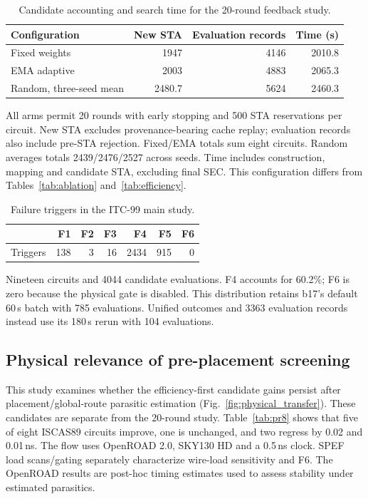 \documentclass[preprint,12pt]{elsarticle}
\begin{document}
\begin{table}[htbp]\centering\small
\caption{Candidate accounting and search time for the 20-round feedback study.}\label{tab:runtime}
\begin{tabular}{lrrr}\toprule
Configuration & New STA & Evaluation records & Time (s)\\\midrule
Fixed weights & 1947 & 4146 & 2010.8\\
EMA adaptive & 2003 & 4883 & 2065.3\\
Random, three-seed mean & 2480.7 & 5624 & 2460.3\\\bottomrule
\end{tabular}
\par\smallskip\footnotesize All arms permit 20 rounds with early stopping and 500 STA reservations per circuit. New STA excludes provenance-bearing cache replay; evaluation records also include pre-STA rejection. Fixed/EMA totals sum eight circuits. Random averages totals 2439/2476/2527 across seeds. Time includes construction, mapping and candidate STA, excluding final SEC. This configuration differs from Tables~\ref{tab:ablation} and~\ref{tab:efficiency}.
\end{table}

\begin{table}[htbp]\centering\small
\caption{Failure triggers in the ITC-99 main study.}\label{tab:f16_dist}
\begin{tabular}{lrrrrrr}\toprule
 & F1 & F2 & F3 & F4 & F5 & F6\\\midrule
Triggers & 138 & 3 & 16 & 2434 & 915 & 0\\\bottomrule
\end{tabular}
\par\smallskip\footnotesize Nineteen circuits and 4044 candidate evaluations. F4 accounts for 60.2\%; F6 is zero because the physical gate is disabled. This distribution retains b17's default 60\,s batch with 785 evaluations. Unified outcomes and 3363 evaluation records instead use its 180\,s rerun with 104 evaluations.
\end{table}

\subsection{Physical relevance of pre-placement screening}\label{sec:phys_closure}
This study examines whether the efficiency-first candidate gains persist after placement/global-route parasitic estimation (Fig.~\ref{fig:physical_transfer}). These candidates are separate from the 20-round study. Table~\ref{tab:pr8} shows that five of eight ISCAS89 circuits improve, one is unchanged, and two regress by 0.02 and 0.01\,ns. The flow uses OpenROAD 2.0, SKY130 HD and a 0.5\,ns clock. SPEF load scans/gating separately characterize wire-load sensitivity and F6. The OpenROAD results are post-hoc timing estimates used to assess stability under estimated parasitics.
\end{document}
